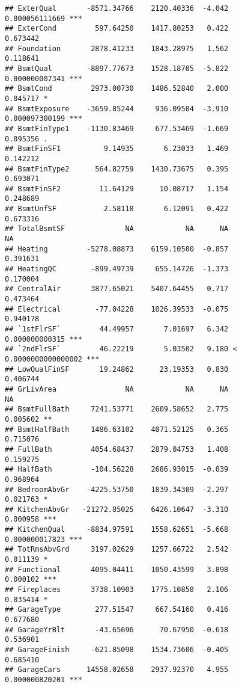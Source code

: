 \documentclass[]{article}
\begin{document}
\begin{verbatim}
## ExterQual       -8571.34766    2120.40336  -4.042       0.000056111669 ***
## ExterCond         597.64250    1417.80253   0.422             0.673442    
## Foundation       2878.41233    1843.28975   1.562             0.118641    
## BsmtQual        -8897.77673    1528.18705  -5.822       0.000000007341 ***
## BsmtCond         2973.00730    1486.52840   2.000             0.045717 *  
## BsmtExposure    -3659.85244     936.09504  -3.910       0.000097300199 ***
## BsmtFinType1    -1130.83469     677.53469  -1.669             0.095356 .  
## BsmtFinSF1          9.14935       6.23033   1.469             0.142212    
## BsmtFinType2      564.82759    1430.73675   0.395             0.693071    
## BsmtFinSF2         11.64129      10.08717   1.154             0.248689    
## BsmtUnfSF           2.58118       6.12091   0.422             0.673316    
## TotalBsmtSF              NA            NA      NA                   NA    
## Heating         -5278.08873    6159.10500  -0.857             0.391631    
## HeatingQC        -899.49739     655.14726  -1.373             0.170004    
## CentralAir       3877.65021    5407.64455   0.717             0.473464    
## Electrical        -77.04228    1026.39533  -0.075             0.940178    
## `1stFlrSF`         44.49957       7.01697   6.342       0.000000000315 ***
## `2ndFlrSF`         46.22219       5.03502   9.180 < 0.0000000000000002 ***
## LowQualFinSF       19.24862      23.19353   0.830             0.406744    
## GrLivArea                NA            NA      NA                   NA    
## BsmtFullBath     7241.53771    2609.58652   2.775             0.005602 ** 
## BsmtHalfBath     1486.63102    4071.52125   0.365             0.715076    
## FullBath         4054.68437    2879.04753   1.408             0.159275    
## HalfBath         -104.56228    2686.93015  -0.039             0.968964    
## BedroomAbvGr    -4225.53750    1839.34309  -2.297             0.021763 *  
## KitchenAbvGr   -21272.85025    6426.10647  -3.310             0.000958 ***
## KitchenQual     -8834.97591    1558.62651  -5.668       0.000000017823 ***
## TotRmsAbvGrd     3197.02629    1257.66722   2.542             0.011139 *  
## Functional       4095.04411    1050.43599   3.898             0.000102 ***
## Fireplaces       3738.10903    1775.10858   2.106             0.035414 *  
## GarageType        277.51547     667.54160   0.416             0.677680    
## GarageYrBlt       -43.65696      70.67950  -0.618             0.536901    
## GarageFinish     -621.85098    1534.73606  -0.405             0.685410    
## GarageCars      14558.02658    2937.92370   4.955       0.000000820201 ***

\end{verbatim}
\end{document}
